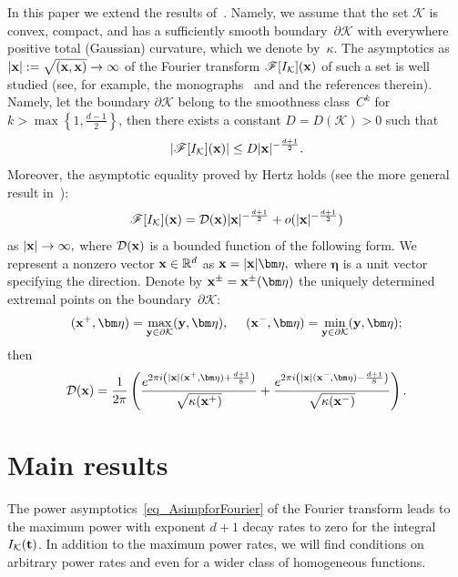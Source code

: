 \documentclass[12pt]{article}
\begin{document}
In this paper we extend the results of~\cite{Po23}. Namely, we assume that the set $\mathcal{K}$ is convex, compact, and has a sufficiently smooth boundary~${\partial\mathcal{K}}$ with everywhere positive total (Gaussian) curvature, which we denote by~$\kappa.$ The asymptotics as ${|{\bf x}|:=\sqrt{({\bf x},{\bf x})}\to\infty}$ of the Fourier transform ${\mathscr{F}[I_{\mathcal{K}}]({\bf x})}$ of such a set is well studied (see, for example, the monographs~\cite[Chapter~VIII]{S93} and \cite[\S 2.3]{IL14} and the references therein). Namely, let the boundary $\partial\mathcal{K}$ belong to the smoothness class~$C^k$ for ${k>\max\left\{1,\frac{d-1}{2}\right\}}$, then there exists a constant ${D=D(\mathcal{K})>0}$ such that
\begin{equation}\label{eq_EstimationforFourier}
|\mathscr{F}[I_{\mathcal{K}}]({\bf x})|\leq D|{\bf x}|^{-\frac{d+1}{2}}.
\end{equation}
Moreover, the asymptotic equality proved by Hertz holds (see the more general result in~\cite[Theorem~2.29]{IL14}):
\begin{equation}\label{eq_AsimpforFourier}
\mathscr{F}[I_{\mathcal{K}}]({\bf x})=\mathcal{D}({\bf x})|{\bf x}|^{-\frac{d+1}{2}}+o(|{\bf x}|^{-\frac{d+1}{2}})
\end{equation}
as $|{\bf x}|\to\infty,$ where $\mathcal{D}({\bf x})$ is a bounded function of the following form.
We represent a nonzero vector ${{\bf x}\in\mathbb{R}^d}$ as ${{\bf x}=|{\bf x}|\bm\eta},$ where $\bm\eta$ is a unit vector specifying the direction. Denote by ${{\bf x}^{\pm}={\bf x}^{\pm}(\bm\eta)}$ the uniquely determined extremal points on the boundary~$\partial\mathcal{K}:$
$$
({\bf x}^+,\bm\eta)=\max_{{\bf y}\in\partial\mathcal{K}}({\bf y},\bm\eta),\ \ \ \
({\bf x}^-,\bm\eta)=\min_{{\bf y}\in\partial\mathcal{K}}({\bf y},\bm\eta);
$$
then
\begin{equation}\label{eq_Herz}
\mathcal{D}({\bf x})=\frac{1}{2\pi}\left(\frac{e^{2\pi i\left(|{\bf x}|({\bf x}^+,\bm\eta)+\frac{d+1}{8}\right)}}{\sqrt{\kappa({\bf x}^+)}}+\frac{e^{2\pi i\left(|{\bf x}|({\bf x}^-,\bm\eta)-\frac{d+1}{8}\right)}}{\sqrt{\kappa({\bf x}^-)}}\right).
\end{equation}

\section{Main results}

The power asymptotics~\eqref{eq_AsimpforFourier} of the Fourier transform leads to the maximum power with exponent $d+1$ decay rates to zero for the integral~${I_\mathcal{K}({\bf t})}$. In addition to the maximum power rates, we will find conditions on arbitrary power rates and even for a wider class of homogeneous functions.
\end{document}
